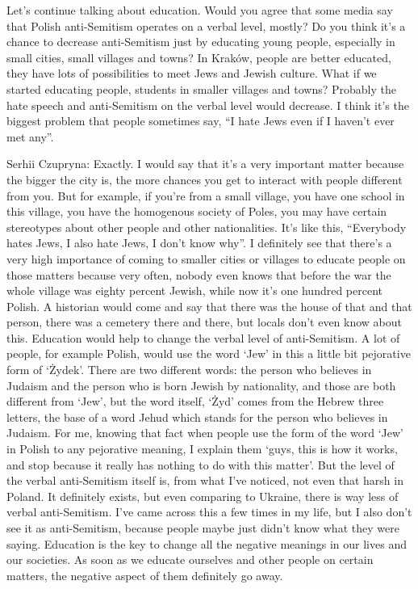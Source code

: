 Let’s continue talking about education. Would you agree that some media say that Polish anti-Semitism operates on a verbal level, mostly? Do you think it’s a chance to decrease anti-Semitism just by educating young people, especially in small cities, small villages and towns? In Kraków, people are better educated, they have lots of possibilities to meet Jews and Jewish culture. What if we started educating people, students in smaller villages and towns? Probably the hate speech and anti-Semitism on the verbal level would decrease. I think it’s the biggest problem that people sometimes say, “I hate Jews even if I haven’t ever met any”. 

Serhii Czupryna: Exactly. I would say that it’s a very important matter because the bigger the city is, the more chances you get to interact with people different from you. But for example, if you’re from a small village, you have one school in this village, you have the homogenous society of Poles, you may have certain stereotypes about other people and other nationalities. It’s like this, “Everybody hates Jews, I also hate Jews, I don’t know why”. I definitely see that there’s a very high importance of coming to smaller cities or villages to educate people on those matters because very often, nobody even knows that before the war the whole village was eighty percent Jewish, while now it’s one hundred percent Polish. A historian would come and say that there was the house of that and that person, there was a cemetery there and there, but locals don’t even know about this. Education would help to change the verbal level of anti-Semitism. A lot of people, for example Polish, would use the word ‘Jew’ in this a little bit pejorative form of ‘Żydek’. There are two different words: the person who believes in Judaism and the person who is born Jewish by nationality, and those are both different from ‘Jew’, but the word itself, ‘Żyd’ comes from the Hebrew three letters, the base of a word Jehud which stands for the person who believes in Judaism. For me, knowing that fact when people use the form of the word ‘Jew’ in Polish to any pejorative meaning, I explain them ‘guys, this is how it works, and stop because it really has nothing to do with this matter’. But the level of the verbal anti-Semitism itself is, from what I’ve noticed, not even that harsh in Poland. It definitely exists, but even comparing to Ukraine, there is way less of verbal anti-Semitism. I’ve came across this a few times in my life, but I also don’t see it as anti-Semitism, because people maybe just didn’t know what they were saying. Education is the key to change all the negative meanings in our lives and our societies. As soon as we educate ourselves and other people on certain matters, the negative aspect of them definitely go away.  

